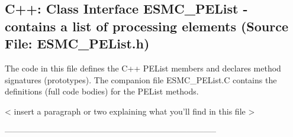  
\parskip        0pt
\parindent      0pt
\baselineskip  11pt
 
\def\bv{\begin{verbatim}}
\def\ev{\end{verbatim}}
\def\be{\begin{equation}}
\def\ee{\end{equation}}
\def\bea{\begin{eqnarray}}
\def\eea{\end{eqnarray}}
\def\bi{\begin{itemize}}
\def\ei{\end{itemize}}
\def\bn{\begin{enumerate}}
\def\en{\end{enumerate}}
\def\bd{\begin{description}}
\def\ed{\end{description}}
\def\({\left (}
\def\){\right )}
\def\[{\left [}
\def\]{\right ]}
\def\<{\left  \langle}
\def\>{\right \rangle}
\def\cI{{\cal I}}
\def\diag{\mathop{\rm diag}}
\def\tr{\mathop{\rm tr}}


 
\subsection{C++:  Class Interface ESMC\_PEList - contains a list of processing elements (Source File: ESMC\_PEList.h)}


  
  
   The code in this file defines the C++ PEList members and declares method 
   signatures (prototypes).  The companion file ESMC\_PEList.C contains
   the definitions (full code bodies) for the PEList methods.
  
   < insert a paragraph or two explaining what you'll find in this file >
  
  -----------------------------------------------------------------------------
   
